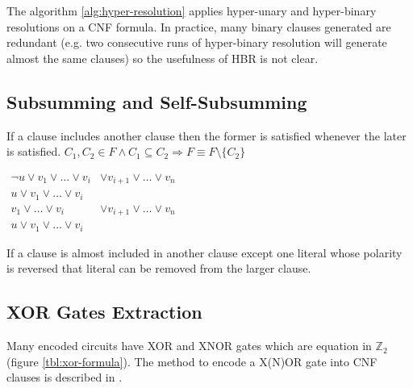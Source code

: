 The algorithm \ref{alg:hyper-resolution} applies hyper-unary
and hyper-binary resolutions on a CNF formula. In practice, many
binary clauses generated are redundant (e.g. two consecutive runs
of hyper-binary resolution will generate almost the same clauses)
so the usefulness of HBR is not clear.


\subsection{Subsumming and Self-Subsumming}
\label{ssec:sss}

\begin{myprop}[Subsumming]
  If a clause includes another clause then the former is satisfied whenever the
  later is satisfied.
  $C_1, C_2 \in F \land C_1 \subseteq C_2 \Rightarrow F \equiv F \setminus \{
  C_2 \}$
\end{myprop}

\begin{myprop}
  $\begin{array}{rl}
    \neg u \lor v_1 \lor \ldots \lor v_i &\lor v_{i+1} \lor \ldots \lor v_n \\
    u \lor v_1 \lor \ldots \lor v_i & \\
    \hline
    v_1 \lor \ldots \lor v_i &\lor v_{i+1} \lor \ldots \lor v_n \\
    u \lor v_1 \lor \ldots \lor v_i &
  \end{array}$

  If a clause is almost included in another clause except one literal whose
  polarity is reversed that literal can be removed from the larger clause.
\end{myprop}



\subsection{XOR Gates Extraction}
\label{ssec:xor-extraction}

Many encoded circuits have XOR and XNOR gates which are equation
in $\mathbb{Z}_2$ (figure \ref{tbl:xor-formula}). The method
to encode a X(N)OR gate into CNF clauses is described in
\cite{Roy_restoringcircuit}.

\begin{table}
  \centering

  \caption{XOR/XNOR gates}
  \label{tbl:xor-formula}
\end{table}

